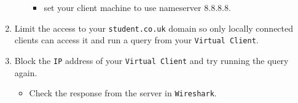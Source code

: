 \documentclass[11pt]{article}
\begin{document}
\begin{enumerate}
\begin{itemize}
\begin{itemize}
                    \item set your client machine to use nameserver 8.8.8.8.
                \end{itemize}
            \end{itemize}
    \item Limit the access to your \texttt{student.co.uk} domain so only locally connected clients can access it and run a query from your \texttt{Virtual Client}. 
    \item Block the \texttt{IP} address of your \texttt{Virtual Client} and try running the query again.
        \begin{itemize}
            \item Check the response from the server in \texttt{Wireshark}.
        \end{itemize}
\end{enumerate}    
\end{document}
